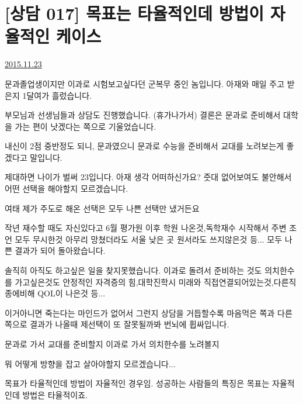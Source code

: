 \section{[상담 017] 목표는 타율적인데 방법이 자율적인 케이스}
\href{https://www.kockoc.com/Apoc/505860}{2015.11.23}

\vspace{5mm}

문과졸업생이지만 이과로 시험보고싶다던 군복무 중인 놈입니다.
아재와 매일 주고 받은지 1달여가 흘렀습니다.
\vspace{5mm}

부모님과 선생님들과 상담도 진행했습니다. (휴가나가서)
결론은 문과로 준비해서 대학을 가는 편이 낫겠다는 쪽으로 기울었습니다.
\vspace{5mm}

내신이 2점 중반정도 되니, 문과였으니 문과로 수능을 준비해서 교대를 노려보는게 좋겠다고 말입니다.
\vspace{5mm}

제대하면 나이가 벌써 23입니다.
아재 생각 어떠하신가요? 줏대 없어보여도 불안해서 어떤 선택을 해야할지 모르겠습니다.
\vspace{5mm}

여태 제가 주도로 해온 선택은 모두 나쁜 선택만 냈거든요
\vspace{5mm}

작년 재수할 때도 자신있다고 6월 평가원 이후 학원 나온것,독학재수 시작해서 주변 조언 모두 무시한것
아무리 망쳤더라도 서울 낮은 곳 원서라도 쓰지않은것 등... 모두 나쁜 결과가 되어 돌아왔습니다.
\vspace{5mm}

솔직히 아직도 하고싶은 일을 찾지못했습니다. 이과로 돌려서 준비하는 것도
의치한수를 가고싶은것도 안정적인 자격증의 힘,대학진학시 미래와 직접연결되어있는것,다른직종에비해
QOL이 나은것 등...
\vspace{5mm}

이거아니면 죽는다는 마인드가 없어서 그런지 상담을 거듭할수록 마음먹은 쪽과 다른쪽으로 결과가 나올때
제선택이 또 잘못될까봐 번뇌에 휩싸입니다.
\vspace{5mm}

문과로 가서 교대를 준비할지
이과로 가서 의치한수를 노려볼지
\vspace{5mm}

뭐 어떻게 방향을 잡고 살아야할지 모르겠습니다...
\vspace{5mm}

목표가 타율적인데 방법이 자율적인 경우임.
성공하는 사람들의 특징은
목표는 자율적인데 방법은 타율적이죠.
\vspace{5mm}

